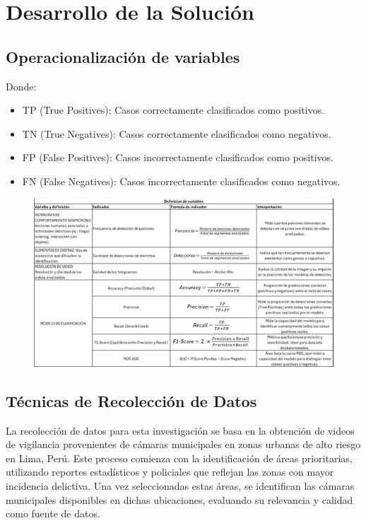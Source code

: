 \chapter{Desarrollo de la Solución}

\section{Operacionalización de variables}
Donde:
\begin{itemize}
    \item TP (True Positives): Casos correctamente clasificados como positivos.
    \item TN (True Negatives): Casos correctamente clasificados como negativos.
    \item FP (False Positives): Casos incorrectamente clasificados como positivos.
    \item FN (False Negatives): Casos incorrectamente clasificados como negativos.
\end{itemize}

\begin{figure}
    \centering
    \includegraphics[width=1.1\linewidth]{4/op var.png}
\end{figure}
\clearpage

\section{Técnicas de Recolección de Datos}
La recolección de datos para esta investigación se basa en la obtención de videos de vigilancia provenientes de cámaras municipales en zonas urbanas de alto riesgo en Lima, Perú. Este proceso comienza con la identificación de áreas prioritarias, utilizando reportes estadísticos y policiales que reflejan las zonas con mayor incidencia delictiva. Una vez seleccionadas estas áreas, se identifican las cámaras municipales disponibles en dichas ubicaciones, evaluando su relevancia y calidad como fuente de datos.

